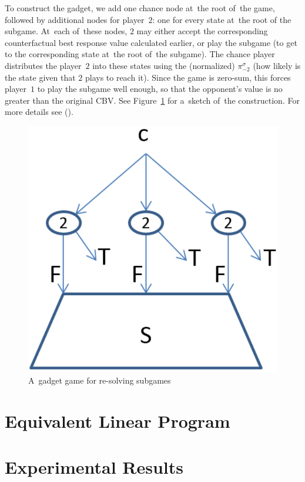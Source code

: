 To construct the gadget, we add one chance node at~the root of~the game, followed by additional nodes for player~$2$:
one for every state at~the root of the subgame.
At~each of~these nodes, $2$ may either accept the corresponding counterfactual best response value calculated earlier, or play the subgame (to get to the corresponding state at~the root of~the subgame).
The chance player distributes the player~$2$ into these states using the (normalized) $\pi^\sigma_{-2}$ (how likely is the state given that $2$ plays to reach it).
Since the game is zero-sum, this forces player~$1$ to play the subgame well enough, so that the opponent's value is no greater than the original CBV.
See Figure~\ref{fig:re-solving-gadget} for a~sketch of~the construction.
For more details see (\cite{BurchJohansonBowling13}).
\begin{figure}[H]
  \centering
  \includegraphics[width=.3\textwidth]{../img/re-solving-game-gadget.png}
  \caption{A~gadget game for re-solving subgames}
  \label{fig:re-solving-gadget}
\end{figure}

\section{Equivalent Linear Program}

\section{Experimental Results}

